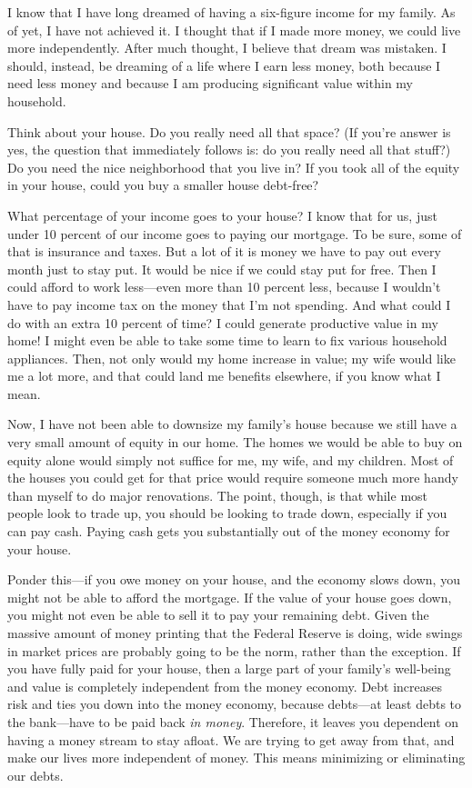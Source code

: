 I know that I have long dreamed of having a six-figure income for my
family. As of yet, I have not achieved it. I thought that if I made
more money, we could live more independently. After much thought, I
believe that dream was mistaken. I should, instead, be dreaming of a
life where I earn less money, both because I need less money and
because I am producing significant value within my household.

Think about your house. Do you really need all that space?
(If you’re answer is
yes, the question that immediately follows is: do you really need all
that stuff?) Do you need the nice neighborhood that you live in?  If
you took all of the equity in your house, could you buy a smaller house
debt-free?

What percentage of your income goes to your house?  I know that for us,
just under 10 percent of our income goes to paying our mortgage. To be
sure, some of that is insurance and taxes. But a lot of it is money we
have to pay out every month just to stay put. It would be nice if we
could stay put for free. Then I could afford to work less—even more
than 10 percent less, because I wouldn’t have to pay income tax on the
money that I’m not spending. And what could I do with an extra 10
percent of time? I could generate productive value in my home! I might
even be able to take some time to learn to fix various household
appliances. Then, not only would my home increase in value; my wife
would like me a lot more, and that could land me benefits elsewhere, if
you know what I mean.

Now, I have not been able to downsize my family's house
because we still have a very small amount of equity in our home. The
homes we would be able to buy on equity alone would simply not suffice
for me, my wife, and my children. Most of the houses you could get for
that price would require someone much more handy than myself to do
major renovations. The point, though, is that while most people look to
trade up, you should be looking to trade down, especially if you can
pay cash. Paying cash gets you substantially out of the money economy
for your house.

Ponder this—if you owe money on your house, and the economy slows down,
you might not be able to afford the mortgage. If the value of your
house goes down, you might not even be able to sell it to pay your
remaining debt. Given the massive amount of money printing that the
Federal Reserve is doing, wide swings in market prices are probably
going to be the norm, rather than the exception. If you have fully paid
for your house, then a large part of your family’s well-being and value
is completely independent from the money economy. Debt increases risk
and ties you down into the money economy, because debts—at least debts
to the bank—have to be paid back \textit{in money}.  Therefore, it
leaves you dependent on having a money stream to stay afloat.  We are
trying to get away from that, and make our lives more independent of
money.  This means minimizing or eliminating our debts.

